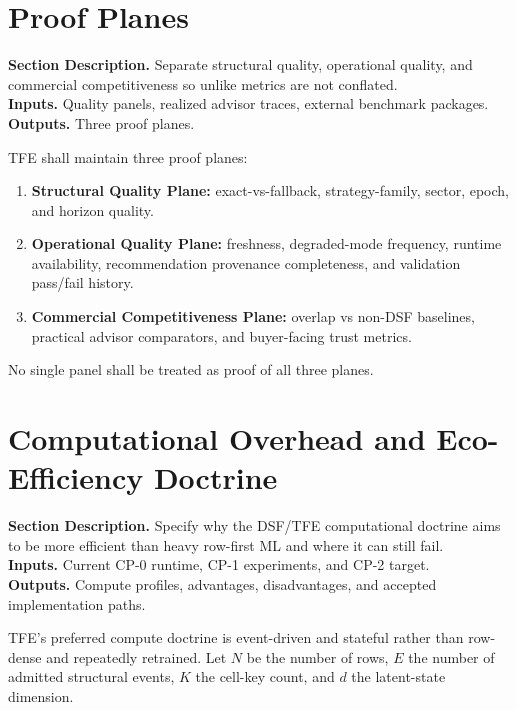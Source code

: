 \documentclass[11pt]{report}
\newcommand{\meta}[3]{\textbf{Section Description.} #1\\
\textbf{Inputs.} #2\\
\textbf{Outputs.} #3\par}
\begin{document}
\section{Proof Planes}
\meta{Separate structural quality, operational quality, and commercial competitiveness so unlike metrics are not conflated.}{Quality panels, realized advisor traces, external benchmark packages.}{Three proof planes.}

TFE shall maintain three proof planes:
\begin{enumerate}[leftmargin=1.2cm]
    \item \textbf{Structural Quality Plane:} exact-vs-fallback, strategy-family, sector, epoch, and horizon quality.
    \item \textbf{Operational Quality Plane:} freshness, degraded-mode frequency, runtime availability, recommendation provenance completeness, and validation pass/fail history.
    \item \textbf{Commercial Competitiveness Plane:} overlap vs non-DSF baselines, practical advisor comparators, and buyer-facing trust metrics.
\end{enumerate}
No single panel shall be treated as proof of all three planes.

\section{Computational Overhead and Eco-Efficiency Doctrine}
\meta{Specify why the DSF/TFE computational doctrine aims to be more efficient than heavy row-first ML and where it can still fail.}{Current CP-0 runtime, CP-1 experiments, and CP-2 target.}{Compute profiles, advantages, disadvantages, and accepted implementation paths.}

TFE's preferred compute doctrine is event-driven and stateful rather than row-dense and repeatedly retrained. Let $N$ be the number of rows, $E$ the number of admitted structural events, $K$ the cell-key count, and $d$ the latent-state dimension.
\end{document}
